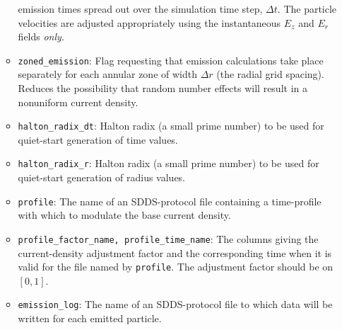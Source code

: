 \begin{itemize}
\begin{itemize}
        emission times spread out over the simulation time step, $\Delta t$.  The particle velocities
        are adjusted appropriately using the instantaneous $E_z$ and $E_r$ fields {\em only}.
    \item {\tt zoned\_emission}: Flag requesting that emission calculations take place separately
        for each annular zone of width $\Delta r$ (the radial grid spacing).  Reduces the possibility
        that random number effects will result in a nonuniform current density.
    \item {\tt halton\_radix\_dt}: Halton radix (a small prime number) to be used for quiet-start
      generation of time values.
    \item {\tt halton\_radix\_r}: Halton radix (a small prime number) to be used for quiet-start
      generation of radius values.
    \item {\tt profile}: The name of an SDDS-protocol file containing a time-profile with which
        to modulate the base current density. 
    \item {\tt profile\_factor\_name, profile\_time\_name}: The columns giving the current-density
        adjustment factor and the corresponding time when it is valid for the file named by
        {\tt profile}.  The adjustment factor should be on $[0, 1]$.
    \item {\tt emission\_log}: The name of an SDDS-protocol file to which data will be written for
      each emitted particle.
\end{itemize}

\end{itemize}
